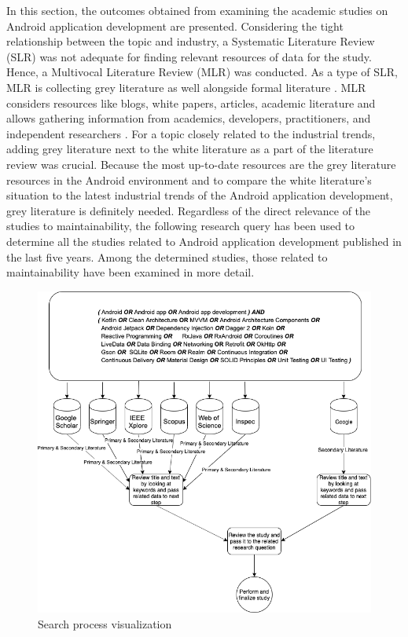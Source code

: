 In this section, the outcomes obtained from examining the academic studies on Android application development are presented. Considering the tight relationship between the topic and industry, a Systematic Literature Review (SLR) was not adequate for finding relevant resources of data for the study. Hence, a Multivocal Literature Review (MLR) was conducted. As a type of SLR, MLR is collecting grey literature as well alongside formal literature \cite{40}. MLR considers resources like blogs, white papers, articles, academic literature and allows gathering information from academics, developers, practitioners, and independent researchers \cite{41}. For a topic closely related to the industrial trends, adding grey literature next to the white literature as a part of the literature review was crucial. Because the most up-to-date resources are the grey literature resources in the Android environment and to compare the white literature's situation to the latest industrial trends of the Android application development, grey literature is definitely needed. Regardless of the direct relevance of the studies to maintainability, the following research query has been used to determine all the studies related to Android application development published in the last five years. Among the determined studies, those related to maintainability have been examined in more detail. 
\begin{figure}[ht!]
    \centering
    \includegraphics[scale=0.4]{figures/research_query.png}
    \caption{Search process visualization}
    \label{fig:lit_review_research_query}
\end{figure}

